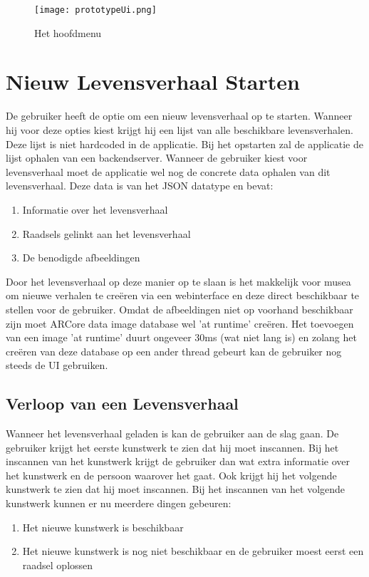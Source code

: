 \begin{figure}
    \texttt{[image: prototypeUi.png]}
    \caption{Het hoofdmenu}
    \label{fig:prototypeUi}
\end{figure}

\section{Nieuw Levensverhaal Starten}
De gebruiker heeft de optie om een nieuw levensverhaal op te starten. Wanneer hij voor deze opties kiest krijgt hij een lijst van alle beschikbare levensverhalen. Deze lijst is niet hardcoded in de applicatie. Bij het opstarten zal de applicatie de lijst ophalen van een backendserver. Wanneer de gebruiker kiest voor levensverhaal moet de applicatie wel nog de concrete data ophalen van dit levensverhaal. Deze data is van het JSON datatype en bevat:

\begin{enumerate}
    \item Informatie over het levensverhaal
    \item Raadsels gelinkt aan het levensverhaal
    \item De benodigde afbeeldingen
\end{enumerate}

Door het levensverhaal op deze manier op te slaan is het makkelijk voor musea om nieuwe verhalen te creëren via een webinterface en deze direct beschikbaar te stellen voor de gebruiker. Omdat de afbeeldingen niet op voorhand beschikbaar zijn moet ARCore data image database wel 'at runtime' creëren. Het toevoegen van een image 'at runtime' duurt ongeveer 30ms (wat niet lang is) en zolang het creëren van deze database op een ander thread gebeurt kan de gebruiker nog steeds de UI gebruiken.

\subsection{Verloop van een Levensverhaal}
Wanneer het levensverhaal geladen is kan de gebruiker aan de slag gaan. De gebruiker krijgt het eerste kunstwerk te zien dat hij moet inscannen. Bij het inscannen van het kunstwerk krijgt de gebruiker dan wat extra informatie over het kunstwerk en de persoon waarover het gaat. Ook krijgt hij het volgende kunstwerk te zien dat hij moet inscannen. Bij het inscannen van het volgende kunstwerk kunnen er nu meerdere dingen gebeuren:

\begin{enumerate}
    \item Het nieuwe kunstwerk is beschikbaar
    \item Het nieuwe kunstwerk is nog niet beschikbaar en de gebruiker moest eerst een raadsel oplossen
\end{enumerate}

